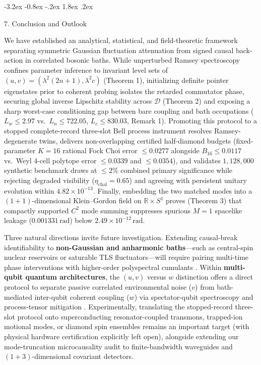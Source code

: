 \documentclass[11pt,letterpaper]{article}
\makeatletter
\renewcommand\section{\@startsection{section}{1}{\z@}%
  {-3.2ex \@plus -0.8ex \@minus -.2ex}%
  {1.8ex \@plus .2ex}%
  {\normalfont\Large\bfseries\raggedright\hyphenpenalty=10000}}
\theoremstyle{definition}
\makeatother
\begin{document}
\section{7. Conclusion and Outlook}\label{conclusion-and-outlook}

We have established an analytical, statistical, and field-theoretic
framework separating symmetric Gaussian fluctuation attenuation from
signed causal back-action in correlated bosonic baths. While unperturbed
Ramsey spectroscopy confines parameter inference to invariant level sets
of \((u, v) = (\lambda^2(2n+1), \lambda^2 c)\) (Theorem 1), initializing
definite pointer eigenstates prior to coherent probing isolates the
retarded commutator phase, securing global inverse Lipschitz stability
across \(\mathcal{D}\) (Theorem 2) and exposing a sharp worst-case
conditioning gap between bare coupling and bath occupations
(\(L_w \le 2.97\) vs.~\(L_n \le 722.05\), \(L_c \le 830.03\), Remark 1).
Promoting this protocol to a stopped complete-record three-slot Bell
process instrument resolves Ramsey-degenerate twins, delivers
non-overlapping certified half-diamond budgets (fixed-parameter \(K=16\)
rational Fock Choi error \(\le 0.0277\) alongside \(B_{16} \le 0.0117\)
vs.~Weyl 4-cell polytope error \(\le 0.0339\) and \(\le 0.0354\)), and
validates \(1{,}128{,}000\) synthetic benchmark draws at \(\le 2\%\)
combined primary significance while rejecting degraded visibility
(\(\eta_{\mathrm{chal}} = 0.65\)) and agreeing with persistent unitary
evolution within \(4.82 \times 10^{-13}\). Finally, embedding the two
matched modes into a \((1+1)\)-dimensional Klein--Gordon field on
\(\mathbb{R} \times S^1\) proves (Theorem 3) that compactly supported
\(C^2\) mode summing suppresses spurious \(M=1\) spacelike leakage
(\(0.001331\,\mathrm{rad}\)) below
\(2.49 \times 10^{-12}\,\mathrm{rad}\).

Three natural directions invite future investigation. Extending
causal-break identifiability to \textbf{non-Gaussian and anharmonic
baths}---such as central-spin nuclear reservoirs or saturable TLS
fluctuators---will require pairing multi-time phase interventions with
higher-order polyspectral cumulants \citep{norris2016, szankowski2017}.
Within \textbf{multi-qubit quantum architectures}, the \((u, v)\) versus
\(w\) distinction offers a direct protocol to separate passive
correlated environmental noise (\(v\)) from bath-mediated inter-qubit
coherent coupling (\(w\)) via spectator-qubit spectroscopy and
process-tensor mitigation
\citep{szankowski2016, pazSilva2017, vonLupke2020, white2022}.
Experimentally, translating the stopped-record three-slot protocol onto
superconducting resonator-coupled transmons, trapped-ion motional modes,
or diamond spin ensembles remains an important target (with physical
hardware certification explicitly left open), alongside extending our
mode-truncation microcausality audit to finite-bandwidth waveguides and
\((1+3)\)-dimensional covariant detectors.
\end{document}
